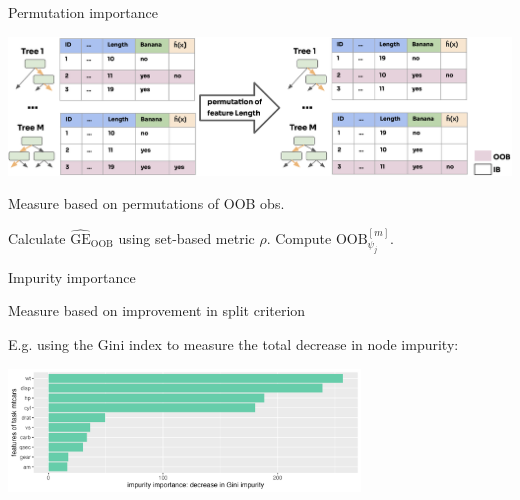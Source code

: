 \documentclass[11pt,compress,t,notes=noshow, xcolor=table]{beamer}
\begin{document}
\begin{vbframe}{Permutation importance}

\includegraphics[width = 1\textwidth]{figure_man/forest-permutation-imp.png}
\vspace{-2ex}
\begin{algorithm}[H]
\scriptsize
\caption*{\small{Measure based on permutations of OOB obs.}}
\begin{algorithmic}[1]
  \State Calculate $\widehat{\mathrm{GE}}_{\text{OOB}}$ using set-based metric $\rho$.
    \State Compute {$\text{OOB}^{[m]}_{\psi_j}$.}
  \EndFor
\end{algorithmic}
\end{algorithm}
\vspace{-2ex}
\end{vbframe}

\begin{vbframe}{Impurity importance}
\vspace{-2ex}
\begin{algorithm}[H]
\small
\caption*{Measure based on improvement in split criterion}
\begin{algorithmic}[1]
  \EndFor
  \EndFor
\end{algorithmic}
\end{algorithm}
\small
E.g. using the Gini index to measure the total decrease in node impurity:

\vspace{-1ex}

\begin{center}
\includegraphics[width=0.7\textwidth]{figure/forest-fimp_gini.png}
\end{center}

\end{vbframe}
\end{document}
